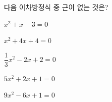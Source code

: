 다음 이차방정식 중 근이 없는 것은?
\begin{choices32}{\rule[-3ex]{0pt}{8ex}$x^2+x-3=0$}{\rule[-3ex]{0pt}{8ex}$x^2+4x+4=0$}{\rule[-3ex]{0pt}{8ex}$\dfrac{1}{3}x^2-2x+2=0$}{\rule[-3ex]{0pt}{8ex}$5x^2+2x+1=0$}{\rule[-3ex]{0pt}{8ex}$9x^2-6x+1=0$}\end{choices32}
